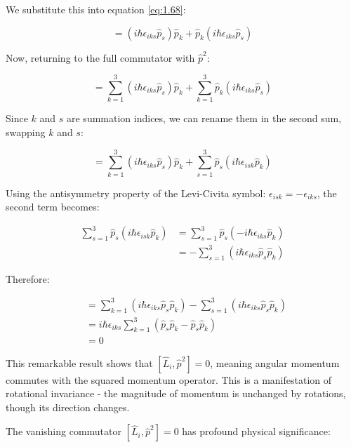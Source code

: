 We substitute this into equation \eqref{eq:1.68}:

\begin{equation}
[\hat{L}_i, \hat{p}_k^2] = (i\hbar\epsilon_{iks}\hat{p}_s)\hat{p}_k + \hat{p}_k(i\hbar\epsilon_{iks}\hat{p}_s)
\end{equation}

Now, returning to the full commutator with $\hat{p}^2$:

\begin{equation}
[\hat{L}_i, \hat{p}^2] = \sum_{k=1}^{3}(i\hbar\epsilon_{iks}\hat{p}_s)\hat{p}_k + \sum_{k=1}^{3}\hat{p}_k(i\hbar\epsilon_{iks}\hat{p}_s)
\end{equation}

Since $k$ and $s$ are summation indices, we can rename them in the second sum, swapping $k$ and $s$:

\begin{equation}
[\hat{L}_i, \hat{p}^2] = \sum_{k=1}^{3}(i\hbar\epsilon_{iks}\hat{p}_s)\hat{p}_k + \sum_{s=1}^{3}\hat{p}_s(i\hbar\epsilon_{isk}\hat{p}_k)
\end{equation}

Using the antisymmetry property of the Levi-Civita symbol: $\epsilon_{isk} = -\epsilon_{iks}$, the second term becomes:

\begin{align}
\sum_{s=1}^{3}\hat{p}_s(i\hbar\epsilon_{isk}\hat{p}_k) &= \sum_{s=1}^{3}\hat{p}_s(-i\hbar\epsilon_{iks}\hat{p}_k) \\
&= -\sum_{s=1}^{3}(i\hbar\epsilon_{iks}\hat{p}_s\hat{p}_k)
\end{align}

Therefore:

\begin{align}
[\hat{L}_i, \hat{p}^2] &= \sum_{k=1}^{3}(i\hbar\epsilon_{iks}\hat{p}_s\hat{p}_k) - \sum_{s=1}^{3}(i\hbar\epsilon_{iks}\hat{p}_s\hat{p}_k) \\
&= i\hbar\epsilon_{iks}\sum_{k=1}^{3}(\hat{p}_s\hat{p}_k - \hat{p}_s\hat{p}_k) \\
&= 0
\end{align}

This remarkable result shows that $[\hat{L}_i, \hat{p}^2] = 0$, meaning angular momentum commutes with the squared momentum operator. This is a manifestation of rotational invariance - the magnitude of momentum is unchanged by rotations, though its direction changes.

The vanishing commutator $[\hat{L}_i, \hat{p}^2] = 0$ has profound physical significance:


